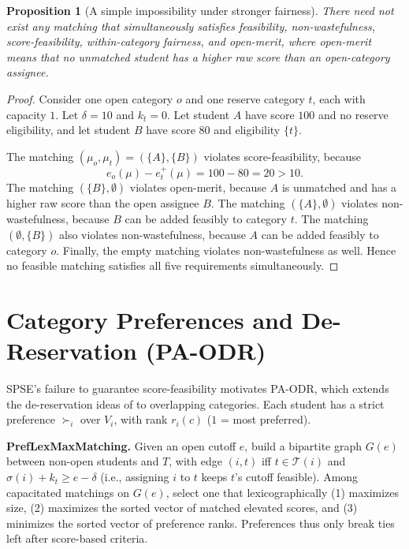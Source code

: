 \documentclass[10pt]{article}
\newtheorem{proposition}{Proposition}
\newcommand{\T}{\mathcal{T}}
\newcommand{\1}{\mathbf{1}}
\begin{document}
\begin{proposition}[A simple impossibility under stronger fairness]
\label{prop:simple-impossibility}
There need not exist any matching that simultaneously satisfies feasibility, non-wastefulness, score-feasibility, within-category fairness, and open-merit, where open-merit means that no unmatched student has a higher raw score than an open-category assignee.
\end{proposition}

\begin{proof}
Consider one open category $o$ and one reserve category $t$, each with capacity $1$. Let $\delta=10$ and $k_t=0$. Let student $A$ have score $100$ and no reserve eligibility, and let student $B$ have score $80$ and eligibility $\{t\}$.

The matching $(\mu_o,\mu_t)=(\{A\},\{B\})$ violates score-feasibility, because
\[
e_o(\mu)-e_t^+(\mu)=100-80=20>10.
\]
The matching $(\{B\},\emptyset)$ violates open-merit, because $A$ is unmatched and has a higher raw score than the open assignee $B$. The matching $(\{A\},\emptyset)$ violates non-wastefulness, because $B$ can be added feasibly to category $t$. The matching $(\emptyset,\{B\})$ also violates non-wastefulness, because $A$ can be added feasibly to category $o$. Finally, the empty matching violates non-wastefulness as well. Hence no feasible matching satisfies all five requirements simultaneously.
\end{proof}

\section{Category Preferences and De-Reservation (PA-ODR)}

SPSE's failure to guarantee score-feasibility motivates \textsc{PA-ODR}, which extends the de-reservation ideas of \citet{AyTu20a,AyTu23a} to overlapping categories. Each student has a strict preference $\succ_i$ over $V_i$, with rank $r_i(c)$ ($1$ = most preferred).

\textbf{PrefLexMaxMatching.} Given an open cutoff $e$, build a bipartite graph $G(e)$ between non-open students and $T$, with edge $(i,t)$ iff $t\in\T(i)$ and $\sigma(i)+k_t\ge e-\delta$ (i.e., assigning $i$ to $t$ keeps $t$'s cutoff feasible). Among capacitated matchings on $G(e)$, select one that lexicographically (1) maximizes size, (2) maximizes the sorted vector of matched elevated scores, and (3) minimizes the sorted vector of preference ranks. Preferences thus only break ties left after score-based criteria.
\end{document}

